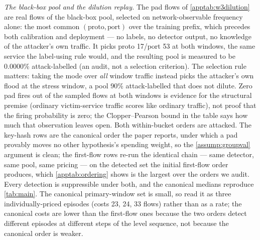 \emph{The black-box pool and the dilution replay.} The pad flows of \cref{apptab:w3dilution} are real
flows of the black-box pool, selected on network-observable frequency alone: the most common
$(\text{proto},\text{port})$ over the training prefix, which precedes both calibration and deployment
--- no labels, no detector output, no knowledge of the attacker's own traffic. It picks proto 17/port 53 at
both windows, the same service the label-using rule would, and the resulting pool is measured to be 0.0000\% attack-labelled
(an audit, not a selection criterion). The selection rule matters: taking the mode over \emph{all}
window traffic instead picks the attacker's own flood at the stress window, a pool 90\%
attack-labelled that does not dilute. Zero pad fires out of the sampled flows at both windows is
evidence for the structural premise (ordinary victim-service traffic scores like ordinary traffic),
not proof that the firing probability is zero; the Clopper--Pearson bound in the table says how much
that observation leaves open. Both within-bucket orders are attacked. The key-hash rows are the
canonical order the paper reports, under which a pad provably moves no other hypothesis's spending
weight, so the \cref{assump:groupval} argument is clean; the first-flow rows re-run the identical chain
--- same detector, same pool, same pricing --- on the detected set the initial first-flow order
produces, which \cref{apptab:ordering} shows is the largest over the orders we audit. Every detection is
suppressible under both, and the canonical medians reproduce \cref{tab:main}. The canonical
primary-window set is small, so read it as three individually-priced episodes (costs 23, 24, 33 flows)
rather than as a rate; the canonical costs are lower than the first-flow ones because the two orders
detect different episodes at different steps of the level sequence, not because the canonical order is
weaker.

